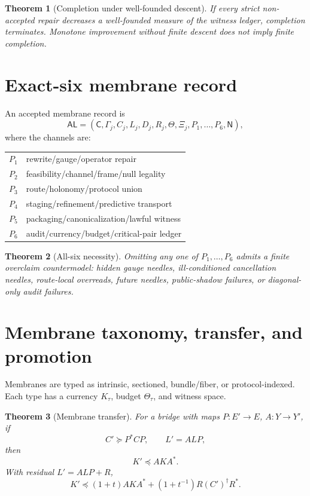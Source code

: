 \documentclass[11pt]{article}
\newtheorem{theorem}{Theorem}[section]
\newcommand{\AL}{\mathsf{AL}}
\begin{document}
\begin{theorem}[Completion under well-founded descent]
If every strict non-accepted repair decreases a well-founded measure of the witness ledger, completion terminates.  Monotone improvement without finite descent does not imply finite completion.
\end{theorem}

\section{Exact-six membrane record}
An accepted membrane record is
\[
\AL=(\mathsf C,\Gamma_j,C_j,L_j,D_j,R_j,\Theta,\Xi_j,P_1,\ldots,P_6,\mathsf N),
\]
where the channels are:
\begin{center}
\begin{tabular}{ll}
\toprule
\(P_1\)& rewrite/gauge/operator repair\\
\(P_2\)& feasibility/channel/frame/null legality\\
\(P_3\)& route/holonomy/protocol union\\
\(P_4\)& staging/refinement/predictive transport\\
\(P_5\)& packaging/canonicalization/lawful witness\\
\(P_6\)& audit/currency/budget/critical-pair ledger\\
\bottomrule
\end{tabular}
\end{center}

\begin{theorem}[All-six necessity]
Omitting any one of \(P_1,\ldots,P_6\) admits a finite overclaim countermodel: hidden gauge needles, ill-conditioned cancellation needles, route-local overreads, future needles, public-shadow failures, or diagonal-only audit failures.
\end{theorem}

\section{Membrane taxonomy, transfer, and promotion}
Membranes are typed as intrinsic, sectioned, bundle/fiber, or protocol-indexed.  Each type has a currency \(K_\tau\), budget \(\Theta_\tau\), and witness space.

\begin{theorem}[Membrane transfer]
For a bridge with maps \(P:E'\to E\), \(A:Y\to Y'\), if
\[
C'\succeq P^*CP,
\qquad L'=ALP,
\]
then
\[
K'\preceq AKA^*.
\]
With residual \(L'=ALP+R\),
\[
K'\preceq (1+t)AKA^*+(1+t^{-1})R(C')^\dagger R^*.
\]
\end{theorem}
\end{document}
